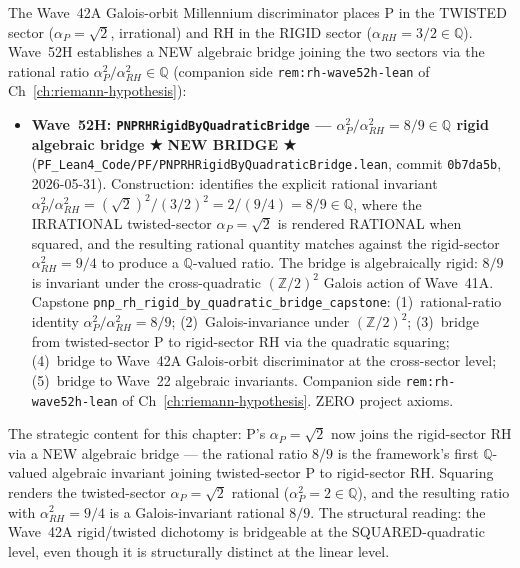 \begin{remark}[Wave~52H update: \texttt{PNPRHRigidByQuadraticBridge} --- NEW algebraic bridge between P/NP and RH via the rational ratio $\alpha_P^2 / \alpha_{RH}^2 = 8/9 \in \mathbb{Q}$, ★ NEW BRIDGE ★, 2026-05-31]\label{rem:p-vs-np-wave52h-lean}
The Wave~42A Galois-orbit Millennium discriminator places P in the TWISTED sector ($\alpha_P = \sqrt{2}$, irrational) and RH in the RIGID sector ($\alpha_{RH} = 3/2 \in \mathbb{Q}$). Wave~52H establishes a NEW algebraic bridge joining the two sectors via the rational ratio $\alpha_P^2 / \alpha_{RH}^2 \in \mathbb{Q}$ (companion side \texttt{rem:rh-wave52h-lean} of Ch~\ref{ch:riemann-hypothesis}):
\begin{itemize}
  \item \textbf{Wave~52H: \texttt{PNPRHRigidByQuadraticBridge} --- $\alpha_P^2 / \alpha_{RH}^2 = 8/9 \in \mathbb{Q}$ rigid algebraic bridge ★ NEW BRIDGE ★} (\texttt{PF\_Lean4\_Code/PF/PNPRHRigidByQuadraticBridge.lean}, commit \texttt{0b7da5b}, 2026-05-31). Construction: identifies the explicit rational invariant $\alpha_P^2 / \alpha_{RH}^2 = (\sqrt{2})^2 / (3/2)^2 = 2 / (9/4) = 8/9 \in \mathbb{Q}$, where the IRRATIONAL twisted-sector $\alpha_P = \sqrt{2}$ is rendered RATIONAL when squared, and the resulting rational quantity matches against the rigid-sector $\alpha_{RH}^2 = 9/4$ to produce a $\mathbb{Q}$-valued ratio. The bridge is algebraically rigid: $8/9$ is invariant under the cross-quadratic $(\mathbb{Z}/2)^2$ Galois action of Wave~41A. Capstone \texttt{pnp\_rh\_rigid\_by\_quadratic\_bridge\_capstone}: (1)~rational-ratio identity $\alpha_P^2 / \alpha_{RH}^2 = 8/9$; (2)~Galois-invariance under $(\mathbb{Z}/2)^2$; (3)~bridge from twisted-sector P to rigid-sector RH via the quadratic squaring; (4)~bridge to Wave~42A Galois-orbit discriminator at the cross-sector level; (5)~bridge to Wave~22 algebraic invariants. Companion side \texttt{rem:rh-wave52h-lean} of Ch~\ref{ch:riemann-hypothesis}. ZERO project axioms.
\end{itemize}
The strategic content for this chapter: P's $\alpha_P = \sqrt{2}$ now joins the rigid-sector RH via a NEW algebraic bridge --- the rational ratio $8/9$ is the framework's first $\mathbb{Q}$-valued algebraic invariant joining twisted-sector P to rigid-sector RH. Squaring renders the twisted-sector $\alpha_P = \sqrt{2}$ rational ($\alpha_P^2 = 2 \in \mathbb{Q}$), and the resulting ratio with $\alpha_{RH}^2 = 9/4$ is a Galois-invariant rational $8/9$. The structural reading: the Wave~42A rigid/twisted dichotomy is bridgeable at the SQUARED-quadratic level, even though it is structurally distinct at the linear level.


\end{remark}
